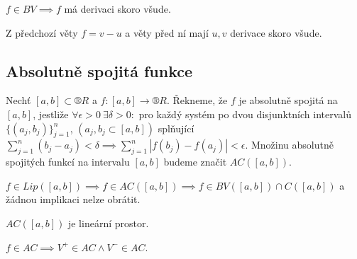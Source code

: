 \documentclass[12pt]{article}					%
\begin{document}
	\begin{dusledek}
		$f \in BV \implies f$ má derivaci skoro všude.

		\begin{dukazin}
			Z předchozí věty $f = v - u$ a věty před ní mají $u, v$ derivace skoro všude.
		\end{dukazin}
	\end{dusledek}


	\subsection{Absolutně spojitá funkce}
	\begin{definice}
		Nechť $[a, b] \subset ®R$ a $f: [a, b] \rightarrow ®R$. Řekneme, že $f$ je absolutně spojitá na $[a, b]$, jestliže $\forall \epsilon > 0\ \exists \delta > 0:$ pro každý systém po dvou disjunktních intervalů $\{(a_j, b_j)\}_{j=1}^n$, $(a_j, b_j \subset [a, b])$ splňující $\sum_{j=1}^n (b_j - a_j) < \delta \implies \sum_{j=1}^n |f(b_j) - f(a_j)| < \epsilon$. Množinu absolutně spojitých funkcí na intervalu $[a, b]$ budeme značit $AC([a, b])$.
	\end{definice}

	\begin{poznamka}
		$f \in Lip([a, b]) \implies f \in AC([a, b]) \implies f \in BV([a, b]) \cap C([a, b])$ a žádnou implikaci nelze obrátit.

		$AC([a, b])$ je lineární prostor.

		$f \in AC \implies V^+ \in AC \land V^- \in AC$.
	\end{poznamka}
\end{document}
